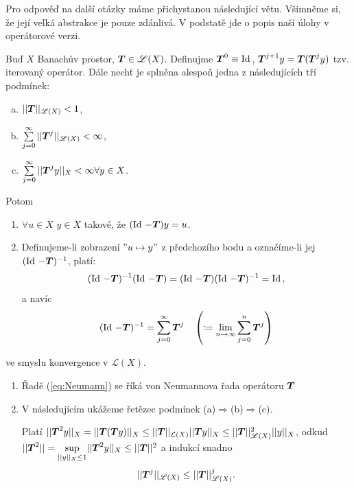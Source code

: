 Pro odpověď na další otázky máme přichystanou následující větu. Všimněme si, že její velká abstrakce je pouze zdánlivá. V podstatě jde o popis naší úlohy v operátorové verzi.


\begin{theorem}
\label{veta1}
Buď $X$ Banachův prostor, $ \boldsymbol{T} \in\mathscr{L}(X)$. Definujme $ \boldsymbol{T} ^0\equiv \operatorname{Id}\,$, $ \boldsymbol{T} ^{j+1}y= \boldsymbol{T} ( \boldsymbol{T} ^jy)$ tzv. iterovaný operátor. Dále nechť je splněna alespoň jedna z následujících tří podmínek:
\begin{enumerate}[(a)]
    \item $|| \boldsymbol{T} ||_{\mathscr{L}(X)}<1$,
    \item $\sum\limits_{j=0}^\infty|| \boldsymbol{T} ^j||_{\mathscr{L}(X)}<\infty$,
    \item $\sum\limits_{j=0}^\infty|| \boldsymbol{T} ^jy||_X<\infty \forall y\in X$.
\end{enumerate}
Potom
\begin{enumerate}
    \item $\forall u \in X$  $y\in X$ takové, že $(\operatorname{Id}\,- \boldsymbol{T} )y=u$.
    \item Definujeme-li zobrazení $"u\mapsto y"$ z předchozího bodu a označíme-li jej $(\operatorname{Id}\,- \boldsymbol{T} )^{-1}$, platí:
    \begin{equation}
        (\operatorname{Id}\,- \boldsymbol{T} )^{-1}(\operatorname{Id}\,- \boldsymbol{T} ) = (\operatorname{Id}\,- \boldsymbol{T} )(\operatorname{Id}\,- \boldsymbol{T} )^{-1}=\operatorname{Id}\,,
    \end{equation}
    a navíc
    \begin{equation}
        (\operatorname{Id}\,- \boldsymbol{T} )^{-1}=\sum\limits_{j=0}^\infty  \boldsymbol{T} ^j \quad \left(\coloneqq \underset{n\rightarrow\infty}{\lim} \sum\limits_{j=0}^{n}  \boldsymbol{T} ^j\right)
        \label{eq:Neumann}
    \end{equation}
\end{enumerate}
ve smyslu konvergence v $\mathscr{L}(X)$.
\end{theorem} 

\Poznamka

\begin{enumerate}
    \item Řadě (\ref{eq:Neumann}) se říká von Neumannova řada operátoru $ \boldsymbol{T} $
    \item V následujícím ukážeme řetězec podmínek (a)$\Rightarrow$(b)$\Rightarrow$(c).
    
    Platí $|| \boldsymbol{T} ^2y||_X = || \boldsymbol{T} ( \boldsymbol{T} y)||_X\leq|| \boldsymbol{T} ||_{\mathcal{L}(X)}|| \boldsymbol{T} y||_X\leq|| \boldsymbol{T} ||^2_{\mathscr{L}(X)}||y||_X$, odkud $|| \boldsymbol{T} ^2||=\underset{||y||_X\leq 1}{\sup}|| \boldsymbol{T} ^2y||_X\leq|| \boldsymbol{T} ||^2$ a indukcí snadno
    \begin{equation}
        || \boldsymbol{T} ^j||_{\mathscr{L}(X)}\leq || \boldsymbol{T} ||^j_{\mathscr{L}(X)}.
    \end{equation}
\end{enumerate}

